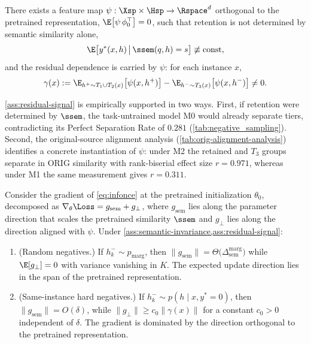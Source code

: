 \begin{assumption}
\label{ass:residual-signal}
There exists a feature map $\psi : \Xsp \times \Hsp \to \Rspace^{d}$ orthogonal to the pretrained representation, $\E\big[\psi\, \phi_0^{\top}\big] = 0$, such that retention is not determined by semantic similarity alone,
\begin{equation}
  \E\big[y^\ast(x,h) \,\big|\, \ssem(q,h) = s\big] \not\equiv \mathrm{const} ,
\end{equation}
and the residual dependence is carried by $\psi$: for each instance $x$,
\begin{equation}
  \gamma(x) := \E_{h^+ \sim T_1 \cup T_2(x)}\big[\psi(x, h^+)\big] - \E_{h^- \sim T_3(x)}\big[\psi(x, h^-)\big] \neq 0.
\end{equation}
\end{assumption}

\noindent
\cref{ass:residual-signal} is empirically supported in two ways. First, if retention were determined by $\ssem$, the task-untrained model M0 would already separate tiers, contradicting its Perfect Separation Rate of $0.281$ (\cref{tab:negative_sampling}). Second, the original-source alignment analysis (\cref{tab:orig-alignment-analysis}) identifies a concrete instantiation of $\psi$: under M2 the retained and $T_3$ groups separate in ORIG similarity with rank-biserial effect size $r = 0.971$, whereas under M1 the same measurement gives $r = 0.311$.

\begin{theorem}
\label{thm:hard-negatives}
Consider the gradient of \eqref{eq:infonce} at the pretrained initialization $\theta_0$, decomposed as $\nabla_\theta \Loss = g_{\mathrm{sem}} + g_{\perp}$, where $g_{\mathrm{sem}}$ lies along the parameter direction that scales the pretrained similarity $\ssem$ and $g_\perp$ lies along the direction aligned with $\psi$. Under \cref{ass:semantic-invariance,ass:residual-signal}:
\begin{enumerate}
  \item[\textup{(a)}] \textup{(Random negatives.)} If $h_k^- \sim p_{\mathrm{marg}}$, then $\|g_{\mathrm{sem}}\| = \Theta\big(\Delta_{\mathrm{sem}}^{\mathrm{marg}}\big)$ while $\E[g_\perp] = 0$ with variance vanishing in $K$. The expected update direction lies in the span of the pretrained representation.

  \item[\textup{(b)}] \textup{(Same-instance hard negatives.)} If $h_k^- \sim p(h \mid x, y^\ast = 0)$, then $\|g_{\mathrm{sem}}\| = O(\delta)$, while $\|g_\perp\| \geq c_0 \|\gamma(x)\|$ for a constant $c_0 > 0$ independent of $\delta$. The gradient is dominated by the direction orthogonal to the pretrained representation.
\end{enumerate}
\end{theorem}

